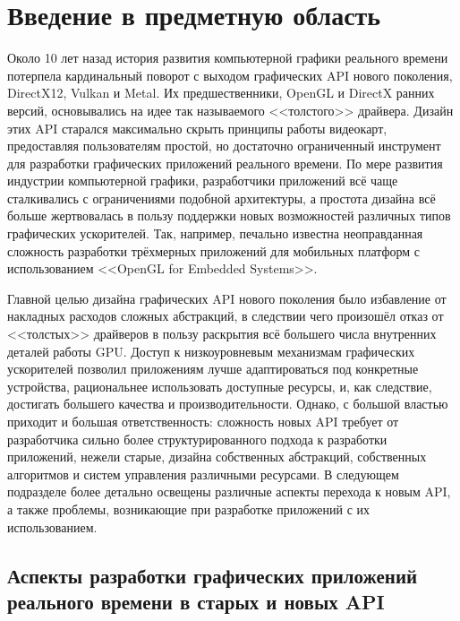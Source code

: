 \section{Введение в предметную область}
Около 10 лет назад история развития компьютерной графики реального времени потерпела кардинальный поворот с выходом графических API нового поколения, DirectX12, Vulkan и Metal.
Их предшественники, OpenGL и DirectX ранних версий, основывались на идее так называемого <<толстого>> драйвера.
Дизайн этих API старался максимально скрыть принципы работы видеокарт, предоставляя пользователям простой, но достаточно ограниченный инструмент для разработки графических приложений реального времени.
По мере развития индустрии компьютерной графики, разработчики приложений всё чаще сталкивались с ограничениями подобной архитектуры, а простота дизайна всё больше жертвовалась в пользу поддержки новых возможностей различных типов графических ускорителей.
Так, например, печально известна неоправданная сложность разработки трёхмерных приложений для мобильных платформ с использованием <<OpenGL for Embedded Systems>>.

Главной целью дизайна графических API нового поколения было избавление от накладных расходов сложных абстракций, в следствии чего произошёл отказ от <<толстых>> драйверов в пользу раскрытия всё большего числа внутренних деталей работы GPU.
Доступ к низкоуровневым механизмам графических ускорителей позволил приложениям лучше адаптироваться под конкретные устройства, рациональнее использовать доступные ресурсы, и, как следствие, достигать большего качества и производительности.
Однако, с большой властью приходит и большая ответственность: сложность новых API требует от разработчика сильно более структурированного подхода к разработки приложений, нежели старые, дизайна собственных абстракций, собственных алгоритмов и систем управления различными ресурсами.
В следующем подразделе более детально освещены различные аспекты перехода к новым API, а также проблемы, возникающие при разработке приложений с их использованием.

\subsection{Аспекты разработки графических приложений реального времени в старых и новых API}
